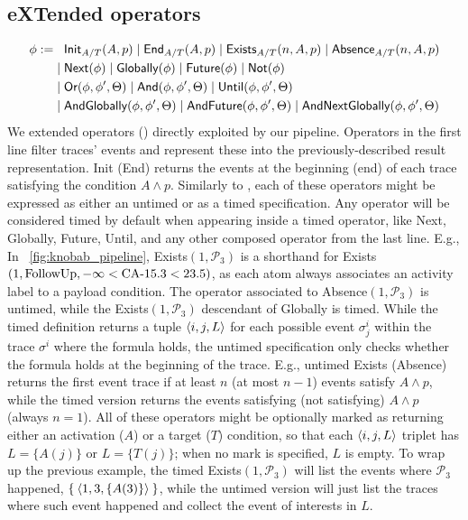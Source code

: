 \subsection{eXTended \LTLf operators}\label{sec:xltlf}
\[\begin{split}
	\phi:=&\;\;\;\textsf{Init}_{A/T}(A,p)\;|\;\textsf{End}_{A/T}(A,p)\;|\;\textsf{Exists}_{A/T}(n,A,p)\;|\;\textsf{Absence}_{A/T}(n,A,p)\\
	&\;|\; \textsf{Next}(\phi)\;|\; \textsf{Globally}(\phi)\;|\; \textsf{Future}(\phi)\;|\; \textsf{Not}(\phi)\\
	&\;|\; \textsf{Or}(\phi,\phi',\Theta)\;|\; \textsf{And}(\phi,\phi',\Theta)\;|\; \textsf{Until}(\phi,\phi',\Theta)\\
	&\;|\; \textsf{AndGlobally}(\phi,\phi',\Theta)\;|\; \textsf{AndFuture}(\phi,\phi',\Theta)\;|\; \textsf{AndNextGlobally}(\phi,\phi',\Theta)\\
\end{split}\]
We  extended \LTLf operators (\xLTLf) directly exploited by our pipeline.
Operators in the first line filter traces' events and represent these into the previously-described result representation. 
\textsf{Init} (\textsf{End}) returns the events at the beginning (end) of each trace satisfying the condition $A\wedge p$. Similarly to \cite{BurattinMS16}, each of these operators might be expressed as either an untimed or as a timed specification. Any operator will be considered timed by default when appearing inside a timed operator, like \textsf{Next}, \textsf{Globally}, \textsf{Future}, \textsf{Until}, and any other composed operator from the last line. E.g., In \figurename~\ref{fig:knobab_pipeline}, \textsf{Exists}$(1,\mathcal{P}_3)$ is a shorthand for \textsf{Exists}$(1,\textrm{FollowUp},-\infty<\textup{CA-15.3}<23.5)$, as each atom always associates an activity label to a payload condition. The operator associated to \textsf{Absence}$(1,\mathcal{P}_3)$ is untimed, while the \textsf{Exists}$(1,\mathcal{P}_3)$ descendant of \textsf{Globally} is timed.  While the timed definition returns a tuple $\braket{i,j,L}$ for each possible event $\sigma^i_j$ within the trace $\sigma^i$ where the formula holds, the untimed specification only checks whether the formula holds at the beginning of the trace. E.g., untimed \textsf{Exists} (\textsf{Absence}) returns the first event trace if at least $n$ (at most $n-1$) events satisfy $A\wedge p$, while the timed version returns the events satisfying (not satisfying) $A\wedge p$ (always $n=1$). All of these operators might be optionally marked as returning either an activation ($A$) or a target ($T$) condition, so that each  $\braket{i,j,L}$ triplet has $L=\{A(j)\}$ or $L=\{T(j)\}$; when no mark is specified, $L$ is empty. To wrap up the previous example, the timed  \textsf{Exists}$(1,\mathcal{P}_3)$ will list the events where $\mathcal{P}_3$ happened, $\Set{\braket{1,3,\{A(3)\}}}$, while the untimed version will just list the traces where such event happened and collect the event of interests in $L$. %


